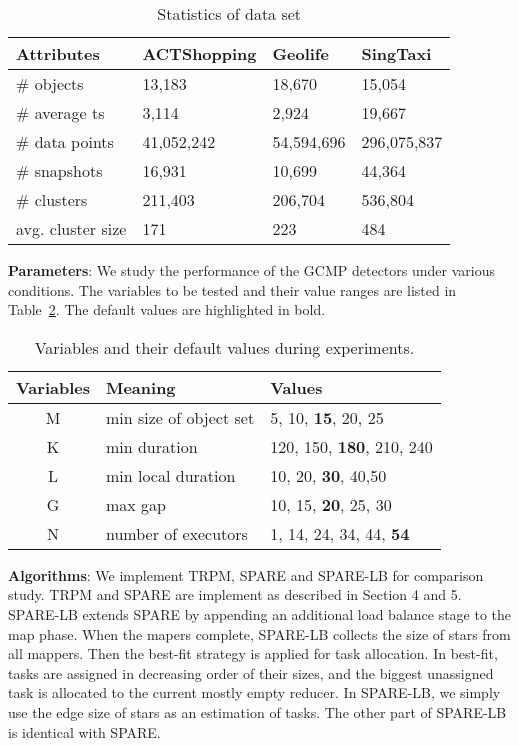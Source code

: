\begin{table} [h]
\center
\small
\begin{tabular}{|l|l|l|l|}
\hline
 \textbf{Attributes}& \textbf{ACTShopping} &  \textbf{Geolife} &  \textbf{SingTaxi} \\ 
\hline 
\# objects  & 13,183 & 18,670 & 15,054\\ 
\hline
\# average ts & 3,114  & 2,924 & 19,667 \\ 
\hline
\# data points  & 41,052,242 & 54,594,696 & 296,075,837\\ 
\hline
\# snapshots  & 16,931 & 10,699 & 44,364\\ 
\hline
\# clusters  & 211,403  & 206,704& 536,804\\
\hline
avg. cluster size  & 171 & 223 & 484\\
\hline
\end{tabular}
\caption{Statistics of data set}
\label{exp:dataset}
\end{table}

\textbf{Parameters}: We study the performance of 
the GCMP detectors under various conditions. The variables
to be tested and their value ranges are listed in Table~\ref{tbl:parameters}. 
The default values are highlighted in bold.
\begin{table}[h]
\small
\begin{tabular}{c|l|l}
\hline 
\textbf{Variables} & \textbf{Meaning} & \textbf{Values} \\ 
\hline 
M & min size of object set &  5, 10,  \textbf{15}, 20, 25 \\ 
\hline 
K & min duration & 120, 150, \textbf{180}, 210, 240 \\ 
\hline 
L & min local duration & 10, 20, \textbf{30}, 40,50 \\ 
\hline 
G & max gap & 10, 15, \textbf{20}, 25, 30 \\ 
\hline
N & number of executors & 1, 14, 24, 34, 44, \textbf{54}\\ 
\hline 
\end{tabular} 
\caption{Variables and their default values during experiments.}
\label{tbl:parameters}
\end{table}

\textbf{Algorithms}: We implement TRPM, SPARE and SPARE-LB for comparison study. TRPM and SPARE are implement as described in Section 4 and 5. SPARE-LB extends SPARE by appending an additional load balance stage to the map phase. 
When the mapers complete, SPARE-LB collects the size of stars from all mappers. 
Then the best-fit strategy is applied for task allocation. In best-fit, 
tasks are assigned in decreasing order of their sizes, and the biggest 
unassigned task is allocated to the current mostly empty reducer. 
In SPARE-LB, we simply use the edge size of stars as an estimation of tasks. The other
part of SPARE-LB is identical with SPARE.



